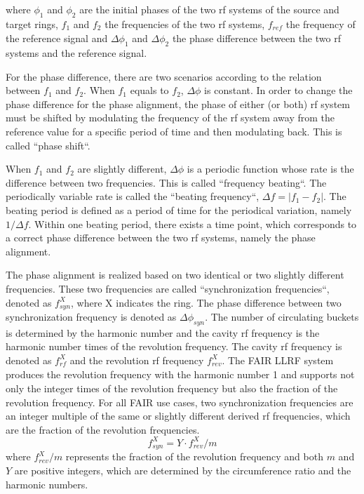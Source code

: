 where $\phi_1$ and $\phi_2$ are the initial phases of the two rf systems of the source and target rings, $f_1$ and $f_2$ the frequencies of the two rf systems, $f_\mathit{ref}$ the frequency of the reference signal and $\Delta \phi_1$ and $\Delta \phi_2$ the phase difference between the two rf systems and the reference signal. 

For the phase difference, there are two scenarios according to the relation between $f_1$ and $f_2$. When $f_1$ equals to $f_2$, $\Delta \phi$ is constant. In order to change the phase difference for the phase alignment, the phase of either (or both) rf system must be shifted by modulating the frequency of the rf system away from the reference value for a specific period of time and then modulating back. This is called ``phase shift``.

When $f_1$ and $f_2$ are slightly different, $\Delta \phi$ is a periodic function whose rate is the difference between two frequencies. This is called ``frequency beating``. The periodically variable rate is called the ``beating frequency``, $\Delta f=|f_1-f_2|$. The beating period is defined as a period of time for the periodical variation, namely $1/\Delta f$. Within one beating period, there exists a time point, which corresponds to a correct phase difference between the two rf systems, namely the phase alignment. 

The phase alignment is realized based on two identical or two slightly different frequencies. These two frequencies are called ``synchronization frequencies``, denoted as $f_\mathit{syn}^{X}$, where X indicates the ring. The phase difference between two synchronization frequency is denoted as $\Delta \phi_\mathit{syn}$. The number of circulating buckets is determined by the harmonic number and the cavity rf frequency is the harmonic number times of the revolution frequency. The cavity rf frequency is denoted as $f_\mathit{rf}^{X}$ and the revolution rf frequency $f_\mathit{rev}^{X}$. The FAIR LLRF system produces the revolution frequency with the harmonic number 1 and supports not only the integer times of the revolution frequency but also the fraction of the revolution frequency. For all FAIR use cases, two synchronization frequencies are an integer multiple of the same or slightly different derived rf frequencies, which are the fraction of the revolution frequencies.
\begin{equation}
f_\mathit{syn}^{X}= Y\cdot f_\mathit{rev}^{X}/m
\label{syn_form}
\end{equation}
where $f_\mathit{rev}^{X}/m$ represents the fraction of the revolution frequency and both $m$ and $Y$ are positive integers, which are determined by the circumference ratio and the harmonic numbers. 

